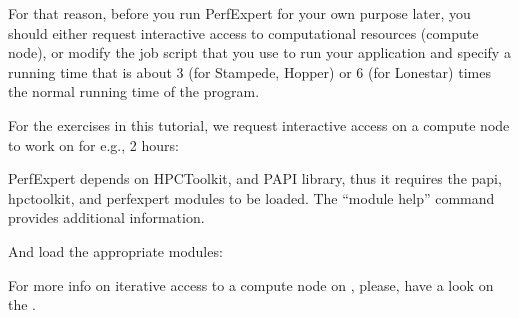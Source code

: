 For that reason, before you run PerfExpert for your own purpose later, you should either request interactive access to computational resources (compute node), or modify the job script that you use to run your application and specify a running time that is about 3 (for Stampede, Hopper) or 6 (for Lonestar) times the normal running time of the program.

For the exercises in this tutorial, we request interactive access on a compute node to work on for e.g., 2 hours:

\iftacc
\begin{prompt}
\end{prompt}
\fi
\ifvsc
\begin{prompt}
\end{prompt}
\fi

PerfExpert depends on HPCToolkit, and PAPI library, thus it requires the papi, hpctoolkit, and perfexpert modules to be loaded. The ``module help'' command provides additional information.

And load the appropriate modules:
\iftacc
\begin{prompt}
\end{prompt}
\fi
\ifvsc
\begin{prompt}
\end{prompt}
\fi
\ifbrussel
\begin{prompt}
\end{prompt}
\fi

For more info on iterative access to a compute node on \hpcname, please, have a look on the \hpcuserguide.

